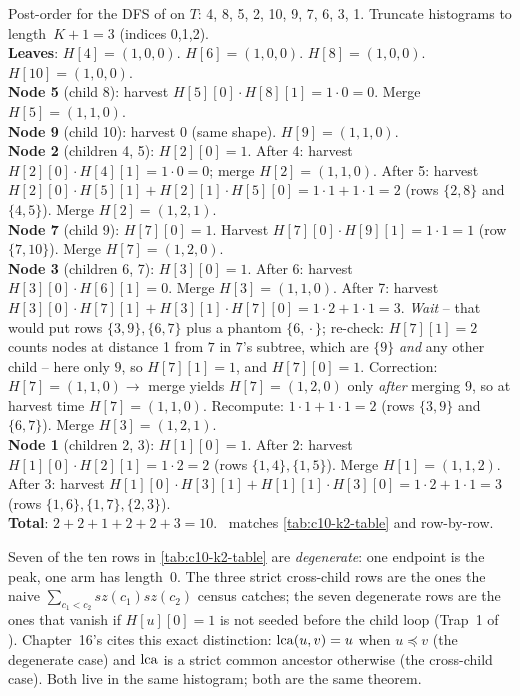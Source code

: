 \begin{tracebox}[$k=2$ census via \coderef{c10-distk-hist} on $T$, peak histogram path]
Post-order for the DFS of  on $T$: 4, 8, 5, 2,
10, 9, 7, 6, 3, 1. Truncate histograms to length~$K+1=3$ (indices 0,1,2).
\\[2pt]
\textbf{Leaves}: $H[4]=(1,0,0)$. $H[6]=(1,0,0)$. $H[8]=(1,0,0)$.
$H[10]=(1,0,0)$.\\[2pt]
\textbf{Node 5} (child 8): harvest $H[5][0]\!\cdot\!H[8][1]=1\!\cdot\!0=0$.
Merge $H[5]=(1,1,0)$.\\
\textbf{Node 9} (child 10): harvest $0$ (same shape). $H[9]=(1,1,0)$.\\[2pt]
\textbf{Node 2} (children 4, 5): $H[2][0]=1$. After 4: harvest
$H[2][0]\!\cdot\!H[4][1]=1\!\cdot\!0=0$; merge $H[2]=(1,1,0)$. After 5:
harvest $H[2][0]\!\cdot\!H[5][1]+H[2][1]\!\cdot\!H[5][0]=1\!\cdot\!1+1
\!\cdot\!1=2$ (rows $\{2,8\}$ and $\{4,5\}$). Merge $H[2]=(1,2,1)$.\\[2pt]
\textbf{Node 7} (child 9): $H[7][0]=1$. Harvest $H[7][0]\!\cdot\!H[9][1]
= 1\!\cdot\!1 = 1$ (row $\{7,10\}$). Merge $H[7]=(1,2,0)$.\\
\textbf{Node 3} (children 6, 7): $H[3][0]=1$. After 6: harvest
$H[3][0]\!\cdot\!H[6][1]=0$. Merge $H[3]=(1,1,0)$. After 7: harvest
$H[3][0]\!\cdot\!H[7][1]+H[3][1]\!\cdot\!H[7][0]=1\!\cdot\!2+1\!\cdot\!1=3$.
\emph{Wait} -- that would put rows $\{3,9\}, \{6,7\}$ plus a phantom
$\{6,\!\cdot\!\}$; re-check: $H[7][1]=2$ counts nodes at distance 1 from
$7$ in $7$'s subtree, which are $\{9\}$ \emph{and} any other child --
here only $9$, so $H[7][1]=1$, and $H[7][0]=1$. Correction: $H[7]=(1,1,0)
\to$ merge yields $H[7]=(1,2,0)$ only \emph{after} merging 9, so at
harvest time $H[7]=(1,1,0)$. Recompute: $1\!\cdot\!1+1\!\cdot\!1=2$
(rows $\{3,9\}$ and $\{6,7\}$). Merge $H[3]=(1,2,1)$.\\[2pt]
\textbf{Node 1} (children 2, 3): $H[1][0]=1$. After 2: harvest
$H[1][0]\!\cdot\!H[2][1]=1\!\cdot\!2=2$ (rows $\{1,4\}, \{1,5\}$). Merge
$H[1]=(1,1,2)$. After 3: harvest $H[1][0]\!\cdot\!H[3][1]+H[1][1]
\!\cdot\!H[3][0]=1\!\cdot\!2 + 1\!\cdot\!1 = 3$ (rows $\{1,6\}, \{1,7\},
\{2,3\}$).\\[2pt]
\textbf{Total}: $2+2+1+2+2+3 = 10$. \checkmark\ matches
\ref{tab:c10-k2-table} and  row-by-row.
\end{tracebox}

\begin{insightbox}
Seven of the ten rows in \ref{tab:c10-k2-table} are \emph{degenerate}:
one endpoint is the peak, one arm has length~$0$. The three strict
cross-child rows are the ones the naive $\sum_{c_1<c_2}\mathit{sz}(c_1)
\mathit{sz}(c_2)$ census catches; the seven degenerate rows are the ones
that vanish if $\mathit{H}[u][0]=1$ is not seeded before the child loop
(Trap~1 of ). Chapter~16's  cites
this exact distinction: $\operatorname{lca}(u,v)=u$ when $u\preceq v$ (the degenerate
case) and $\operatorname{lca}$ is a strict common ancestor otherwise (the cross-child
case). Both live in the same histogram; both are the same theorem.
\end{insightbox}

